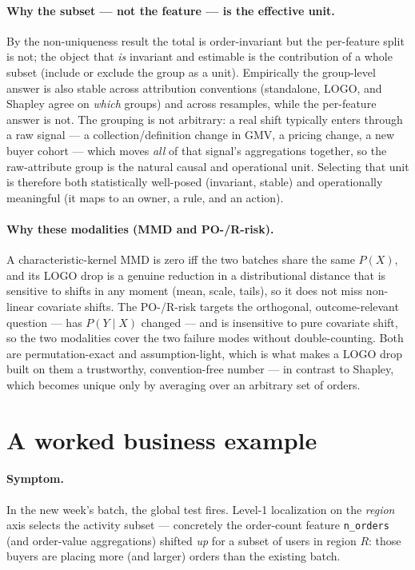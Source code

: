 \documentclass[11pt]{article}
\begin{document}
\paragraph{Why the subset --- not the feature --- is the effective unit.} By the
non-uniqueness result the total is order-invariant but the per-feature split is
not; the object that \emph{is} invariant and estimable is the contribution of a
whole subset (include or exclude the group as a unit). Empirically the
group-level answer is also stable across attribution conventions (standalone,
LOGO, and Shapley agree on \emph{which} groups) and across resamples, while the
per-feature answer is not. The grouping is not arbitrary: a real shift typically
enters through a raw signal --- a collection/definition change in GMV, a pricing
change, a new buyer cohort --- which moves \emph{all} of that signal's
aggregations together, so the raw-attribute group is the natural causal and
operational unit. Selecting that unit is therefore both statistically well-posed
(invariant, stable) and operationally meaningful (it maps to an owner, a rule,
and an action).

\paragraph{Why these modalities (MMD and PO-/R-risk).} A characteristic-kernel
MMD is zero iff the two batches share the same $P(X)$, and its LOGO drop is a
genuine reduction in a distributional distance that is sensitive to shifts in any
moment (mean, scale, tails), so it does not miss non-linear covariate shifts. The
PO-/R-risk targets the orthogonal, outcome-relevant question --- has $P(Y\mid X)$
changed --- and is insensitive to pure covariate shift, so the two modalities
cover the two failure modes without double-counting. Both are permutation-exact
and assumption-light, which is what makes a LOGO drop built on them a
trustworthy, convention-free number --- in contrast to Shapley, which becomes
unique only by averaging over an arbitrary set of orders.

\section{A worked business example}

\paragraph{Symptom.} In the new week's batch, the global test fires. Level-1
localization on the \emph{region} axis selects the activity subset --- concretely
the order-count feature \texttt{n\_orders} (and order-value aggregations) shifted
\emph{up} for a subset of users in region $R$: those buyers are placing more (and
larger) orders than the existing batch.
\end{document}
